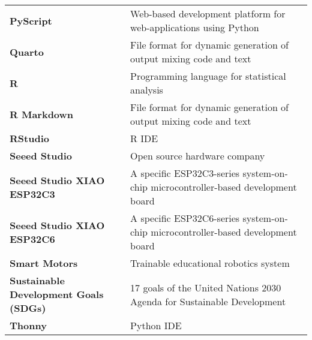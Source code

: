{\begin{longtable}{>{\raggedright \bfseries}p{} p{}}
PyScript            & Web-based development platform for web-applications using Python \\
Quarto              & File format for dynamic generation of output mixing code and text \\
R                   & Programming language for statistical analysis \\
R Markdown          & File format for dynamic generation of output mixing code and text \\
RStudio             & R IDE\\
Seeed Studio        & Open source hardware company \\
Seeed Studio XIAO ESP32C3 & A specific ESP32C3-series system-on-chip microcontroller-based development board \\
Seeed Studio XIAO ESP32C6 & A specific ESP32C6-series system-on-chip microcontroller-based development board\\
Smart Motors        & Trainable educational robotics system \\
Sustainable Development Goals (SDGs) & 17 goals of the United Nations 2030 Agenda for Sustainable Development \\
Thonny              & Python IDE \\

\end{longtable}
}

